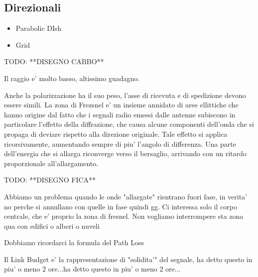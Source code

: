 \subsection{Direzionali}
\begin{itemize}
\item Parabolic DIsh
\item Grid
\end{itemize}
TODO: **DISEGNO CABBO**

Il raggio e' molto basso, altissimo guadagno.

Anche la polarizzazione ha il suo peso, l'asse di ricevuta e di spedizione devono essere simili. La zona di Frezsnel e' un insieme annidato di aree ellittiche che hanno origine dal fatto che i segnali radio emessi dalle antenne subiscono in particolare l'effetto della diffrazione, che causa alcune componenti dell'onda che si propaga di deviare rispetto alla direzione originale. Tale effetto si applica ricorsivamente, aumentando sempre di piu' l'angolo di differenza. Una parte dell'energia che si allarga riconverge verso il bersaglio, arrivando con un ritardo proporzionale all'allargamento.

TODO: **DISEGNO FICA**

Abbiamo un problema quando le onde "allargate" rientrano fuori fase, in verita' no perche si annullano con quelle in fase quindi gg. Ci interessa solo il corpo centrale, che e' proprio la zona di fresnel. Non vogliamo interrompere sta zona qua con edifici o alberi o nuveli

Dobbiamo ricordarci la formula del Path Loss

Il Link Budget e' la rappresentazione di "solidita'" del segnale, ha detto questo in piu' o meno 2 ore...ha detto questo in piu' o meno 2 ore...

\section{}
% 
